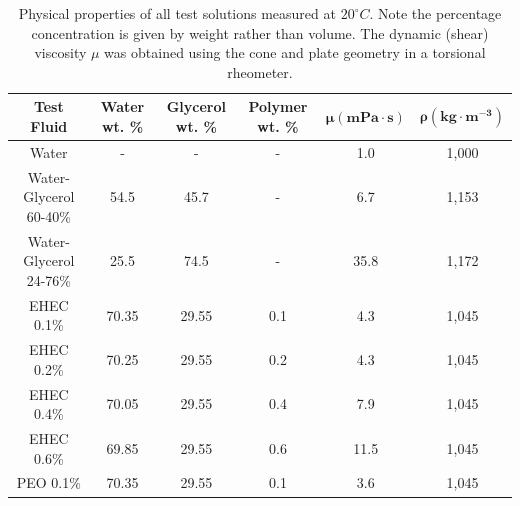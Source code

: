 \documentclass[11pt]{article}
\begin{document}
\begin{table}[t]
\begin{center}
	\begin{tabular}{|c|c|c|c|c|c|} \hline
		\textbf{Test Fluid} & \textbf{Water wt. \%} & \textbf{Glycerol wt. \%} & \textbf{Polymer wt. \%} & $\mathbf{\mu \left(mPa\cdot s\right)}$ & $\mathbf{\rho \left( kg\cdot m^{-3} \right)}$  \\ \hline 
		Water & - & - &  - & 1.0 & 1,000 \\ 
		Water-Glycerol 60-40\% & 54.5 & 45.7 & - & 6.7 & 1,153 \\ 
		Water-Glycerol 24-76\% & 25.5 & 74.5 & - & 35.8 & 1,172  \\
		EHEC 0.1\% & 70.35 & 29.55 & 0.1 & 4.3 & 1,045 \\
		EHEC 0.2\% & 70.25 & 29.55 & 0.2 & 4.3 & 1,045  \\
		EHEC 0.4\% & 70.05 & 29.55 & 0.4 & 7.9 & 1,045  \\
		EHEC 0.6\% & 69.85 & 29.55 & 0.6 & 11.5 & 1,045 \\
		PEO 0.1\% & 70.35 & 29.55 & 0.1 & 3.6 & 1,045 \\ \hline
	\end{tabular}
	\label{tbl:fluid_prop}
	\caption{Physical properties of all test solutions measured at $20^\circ C$. Note the percentage concentration is given by weight rather than volume. The dynamic (shear) viscosity $\mu$ was obtained using the cone and plate geometry in a torsional rheometer.}
\end{center}	
\end{table}
\end{document}
